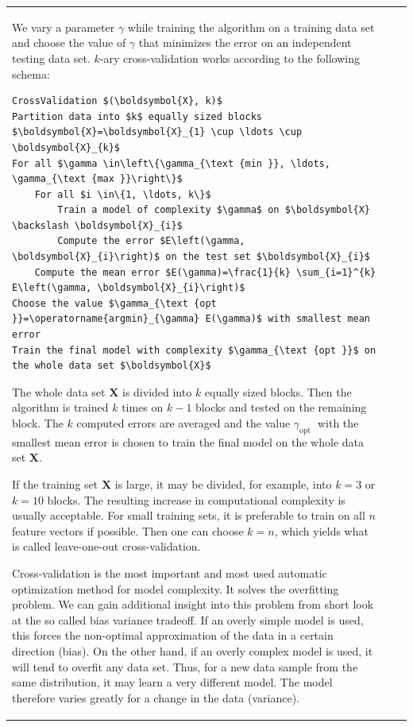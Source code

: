 \documentclass[10pt]{book}
\begin{document}
\begin{center}
\begin{tabular}{|l|l|l|}
We vary a parameter $\gamma$ while training the algorithm on a training data set and choose the value of $\gamma$ that minimizes the error on an independent testing data set. $k$-ary cross-validation works according to the following schema:

\begin{verbatim}
CrossValidation $(\boldsymbol{X}, k)$
Partition data into $k$ equally sized blocks $\boldsymbol{X}=\boldsymbol{X}_{1} \cup \ldots \cup \boldsymbol{X}_{k}$
For all $\gamma \in\left\{\gamma_{\text {min }}, \ldots, \gamma_{\text {max }}\right\}$
    For all $i \in\{1, \ldots, k\}$
        Train a model of complexity $\gamma$ on $\boldsymbol{X} \backslash \boldsymbol{X}_{i}$
        Compute the error $E\left(\gamma, \boldsymbol{X}_{i}\right)$ on the test set $\boldsymbol{X}_{i}$
    Compute the mean error $E(\gamma)=\frac{1}{k} \sum_{i=1}^{k} E\left(\gamma, \boldsymbol{X}_{i}\right)$
Choose the value $\gamma_{\text {opt }}=\operatorname{argmin}_{\gamma} E(\gamma)$ with smallest mean error
Train the final model with complexity $\gamma_{\text {opt }}$ on the whole data set $\boldsymbol{X}$
\end{verbatim}

The whole data set $\boldsymbol{X}$ is divided into $k$ equally sized blocks. Then the algorithm is trained $k$ times on $k-1$ blocks and tested on the remaining block. The $k$ computed errors are averaged and the value $\gamma_{\text {opt }}$ with the smallest mean error is chosen to train the final model on the whole data set $\boldsymbol{X}$.

If the training set $\boldsymbol{X}$ is large, it may be divided, for example, into $k=3$ or $k=10$ blocks. The resulting increase in computational complexity is usually acceptable. For small training sets, it is preferable to train on all $n$ feature vectors if possible. Then one can choose $k=n$, which yields what is called leave-one-out cross-validation.

Cross-validation is the most important and most used automatic optimization method for model complexity. It solves the overfitting problem. We can gain additional insight into this problem from short look at the so called bias variance tradeoff. If an overly simple model is used, this forces the non-optimal approximation of the data in a certain direction (bias). On the other hand, if an overly complex model is used, it will tend to overfit any data set. Thus, for a new data sample from the same distribution, it may learn a very different model. The model therefore varies greatly for a change in the data (variance).


\end{tabular}
\end{center}
\end{document}
